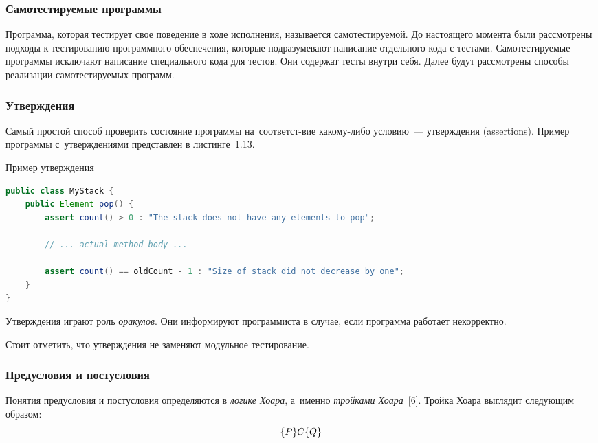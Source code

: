 \subsubsection{Самотестируемые программы}

Программа, которая тестирует свое поведение в ходе исполнения, называется самотестируемой. До настоящего момента были рассмотрены подходы к тестированию программного обеспечения, которые подразумевают написание отдельного кода с тестами. Самотестируемые программы исключают написание специального кода для тестов. Они содержат тесты внутри себя. Далее будут рассмотрены способы реализации самотестируемых программ.

\subsubsection{Утверждения}

Самый простой способ проверить состояние программы на~соответст-вие какому-либо условию~--- утверждения (assertions). Пример программы с~утверждениями представлен в листинге~1.13.

\begin{ListingEnv}[!h]%
	\captiondelim{ } %
	\caption{Пример утверждения}
	\begin{lstlisting}[language={Java}]
public class MyStack {
	public Element pop() {
		assert count() > 0 : "The stack does not have any elements to pop";
		
		// ... actual method body ...
		
		assert count() == oldCount - 1 : "Size of stack did not decrease by one";
	}
}
	\end{lstlisting}
\end{ListingEnv}%


Утверждения играют роль \textit{оракулов}. Они информируют программиста в случае, если программа работает некорректно. 

Стоит отметить, что утверждения не заменяют модульное тестирование. 


\subsubsection{Предусловия и постусловия}	

Понятия предусловия и постусловия определяются в \textit{логике Хоара}, а~именно \textit{тройками Хоара}~[6]. Тройка Хоара выглядит следующим образом: \[\{P\} \space C \space \{Q\}\]

